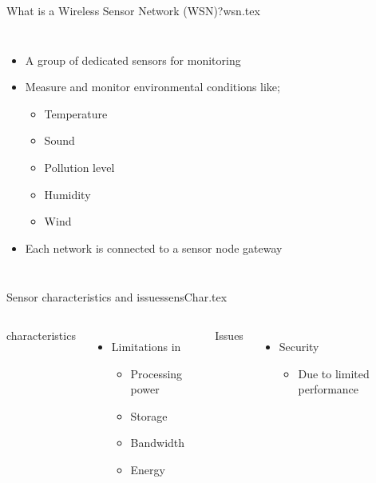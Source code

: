 
\begin{notedFrame}{What is a Wireless Sensor Network (WSN)?}{wsn.tex}
    \begin{columns}[T, onlytextwidth]
        \begin{itemize}
            \item A group of dedicated sensors for monitoring
            \item Measure and monitor environmental conditions like;
            \begin{itemize}
                \item Temperature
                \item Sound
                \item Pollution level
                \item Humidity
                \item Wind
            \end{itemize}
            \item Each network is connected to a sensor node gateway
        \end{itemize}
    
    \end{columns}
\end{notedFrame}

\begin{notedFrame}{Sensor characteristics and issues}{sensChar.tex}
    \begin{columns}[T, onlytextwidth]
            \alert{characteristics}
            \begin{itemize}
                \item Limitations in
                \begin{itemize}
                    \item Processing power
                    \item Storage
                    \item Bandwidth
                    \item Energy
                \end{itemize}
            \end{itemize}
            
            \alert{Issues}
            \begin{itemize}
                \item Security
                \begin{itemize}
                    \item Due to limited performance
                \end{itemize}
            \end{itemize}
    \end{columns}
\end{notedFrame}